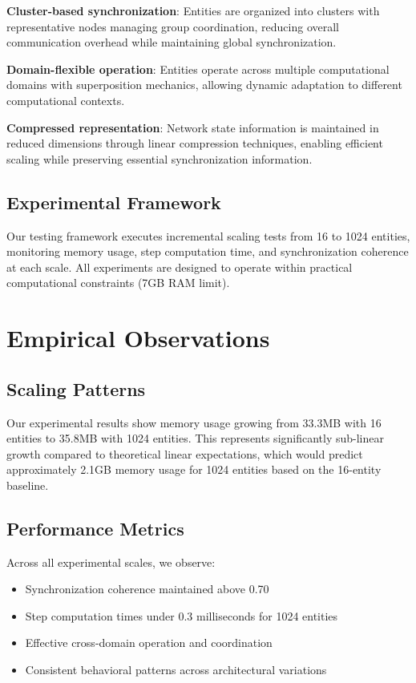 \documentclass[12pt]{article}
\begin{document}
\textbf{Cluster-based synchronization}: Entities are organized into clusters with representative nodes managing group coordination, reducing overall communication overhead while maintaining global synchronization.

\textbf{Domain-flexible operation}: Entities operate across multiple computational domains with superposition mechanics, allowing dynamic adaptation to different computational contexts.

\textbf{Compressed representation}: Network state information is maintained in reduced dimensions through linear compression techniques, enabling efficient scaling while preserving essential synchronization information.

\subsection{Experimental Framework}
Our testing framework executes incremental scaling tests from 16 to 1024 entities, monitoring memory usage, step computation time, and synchronization coherence at each scale. All experiments are designed to operate within practical computational constraints (7GB RAM limit).

\section{Empirical Observations}

\subsection{Scaling Patterns}
Our experimental results show memory usage growing from 33.3MB with 16 entities to 35.8MB with 1024 entities. This represents significantly sub-linear growth compared to theoretical linear expectations, which would predict approximately 2.1GB memory usage for 1024 entities based on the 16-entity baseline.

\subsection{Performance Metrics}
Across all experimental scales, we observe:
\begin{itemize}
    \item Synchronization coherence maintained above 0.70
    \item Step computation times under 0.3 milliseconds for 1024 entities
    \item Effective cross-domain operation and coordination
    \item Consistent behavioral patterns across architectural variations
\end{itemize}
\end{document}
